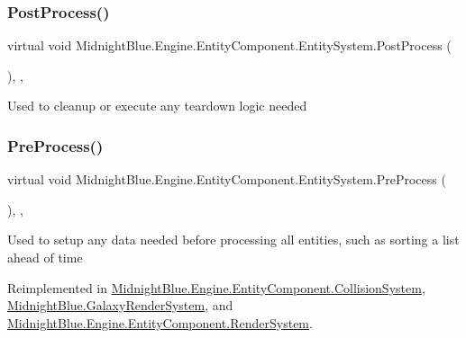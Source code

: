 \subsubsection{\texorpdfstring{Post\+Process()}{PostProcess()}}
{\footnotesize\ttfamily virtual void Midnight\+Blue.\+Engine.\+Entity\+Component.\+Entity\+System.\+Post\+Process (\begin{DoxyParamCaption}{ }\end{DoxyParamCaption})\hspace{0.3cm}{\ttfamily [inline]}, {\ttfamily [protected]}, {\ttfamily [virtual]}}



Used to cleanup or execute any teardown logic needed 

\hypertarget{class_midnight_blue_1_1_engine_1_1_entity_component_1_1_entity_system_a779da2924653b4402ca386dbc52bd3b1}{}\label{class_midnight_blue_1_1_engine_1_1_entity_component_1_1_entity_system_a779da2924653b4402ca386dbc52bd3b1} 
\subsubsection{\texorpdfstring{Pre\+Process()}{PreProcess()}}
{\footnotesize\ttfamily virtual void Midnight\+Blue.\+Engine.\+Entity\+Component.\+Entity\+System.\+Pre\+Process (\begin{DoxyParamCaption}{ }\end{DoxyParamCaption})\hspace{0.3cm}{\ttfamily [inline]}, {\ttfamily [protected]}, {\ttfamily [virtual]}}



Used to setup any data needed before processing all entities, such as sorting a list ahead of time 



Reimplemented in \hyperlink{class_midnight_blue_1_1_engine_1_1_entity_component_1_1_collision_system_ab85ff8fd81369e705c461f58014f5ec2}{Midnight\+Blue.\+Engine.\+Entity\+Component.\+Collision\+System}, \hyperlink{class_midnight_blue_1_1_galaxy_render_system_a269f042fe0c55e47f3b23cc1930ed71a}{Midnight\+Blue.\+Galaxy\+Render\+System}, and \hyperlink{class_midnight_blue_1_1_engine_1_1_entity_component_1_1_render_system_a0c3d20164cc31ae45aa5e0814b08f08f}{Midnight\+Blue.\+Engine.\+Entity\+Component.\+Render\+System}.

